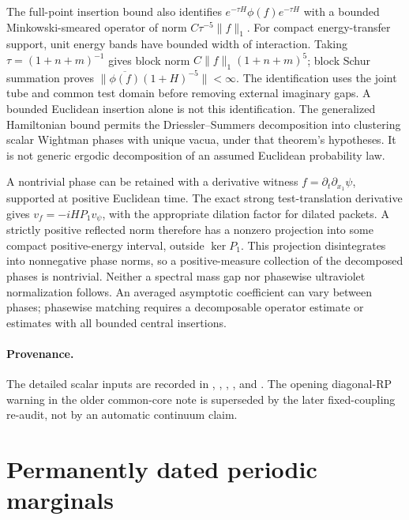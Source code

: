 The full-point insertion bound also identifies
$e^{-\tau H}\phi(f)e^{-\tau H}$ with a bounded Minkowski-smeared
operator of norm $C\tau^{-5}\|f\|_1$.  For compact energy-transfer
support, unit energy bands have bounded width of interaction.  Taking
$\tau=(1+n+m)^{-1}$ gives block norm
$C\|f\|_1(1+n+m)^5$; block Schur summation proves
$\|\overline{\phi(f)}(1+H)^{-5}\|<\infty$.  The identification uses
the joint tube and common test domain before removing external imaginary
gaps.  A bounded Euclidean insertion alone is not this identification.
The generalized Hamiltonian bound permits the Driessler--Summers
decomposition into clustering scalar Wightman phases with unique vacua,
under that theorem's hypotheses.  It is not generic ergodic decomposition
of an assumed Euclidean probability law.

A nontrivial phase can be retained with a derivative witness
$f=\partial_t\partial_{x_1}\psi$, supported at positive Euclidean time.
The exact strong test-translation derivative gives
$v_f=-iHP_1v_\psi$, with the appropriate dilation factor for dilated
packets.  A strictly positive reflected norm therefore has a nonzero
projection into some compact positive-energy interval, outside
$\ker P_1$.  This projection disintegrates into nonnegative phase norms,
so a positive-measure collection of the decomposed phases is nontrivial.
Neither a spectral mass gap nor phasewise ultraviolet normalization
follows.  An averaged asymptotic coefficient can vary between phases;
phasewise matching requires a decomposable operator estimate or estimates
with all bounded central insertions.

\paragraph{Provenance.}
The detailed scalar inputs are recorded in
,
,
,
,
and .
The opening diagonal-RP warning in the older common-core note is superseded
by the later fixed-coupling re-audit, not by an automatic continuum claim.

\section{Permanently dated periodic marginals}
\label{ha:periodic}

